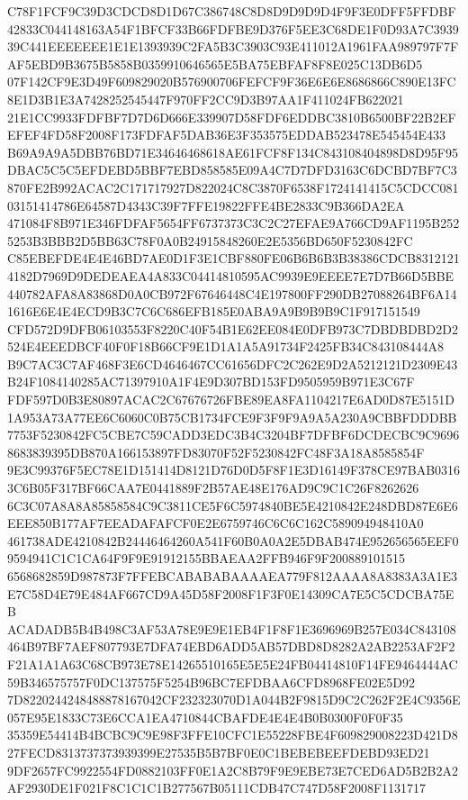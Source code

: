 \documentclass[UTF8,fontset=fandol,zihao=-4,a4paper]{ctexart}
\begin{document}
{{C78F1FCF9C39D3CDCD8D1D67C386748C8D8D9D9D9D4F9F3E0DFF5FFDBF42833C044148163A54F1BFCF33B66FDFBE9D376F5EE3C68DE1F0D93A7C3939
39C441EEEEEEE1E1E1393939C2FA5B3C3903C93E411012A1961FAA989797F7FAF5EBD9B3675B5858B0359910646565E5BA75EBFAF8F8E025C13DB6D5
07F142CF9E3D49F609829020B576900706FEFCF9F36E6E6E8686866C890E13FC8E1D3B1E3A7428252545447F970FF2CC9D3B97AA1F411024FB622021
21E1CC9933FDFBF7D7D6D666E339907D58FDF6EDDBC3810B6500BF22B2EFEFEF4FD58F2008F173FDFAF5DAB36E3F353575EDDAB523478E545454E433
B69A9A9A5DBB76BD71E34646468618AE61FCF8F134C843108404898D8D95F95DBAC5C5C5EFDEBD5BBF7EBD858585E09A4C7D7DFD3163C6DCBD7BF7C3
870FE2B992ACAC2C171717927D822024C8C3870F6538F1724141415C5CDCC08103151414786E64587D4343C39F7FFE19822FFE4BE2833C9B366DA2EA
471084F8B971E346FDFAF5654FF6737373C3C2C27EFAE9A766CD9AF1195B2525253B3BBB2D5BB63C78F0A0B24915848260E2E5356BD650F5230842FC
C85EBEFDE4E4E46BD7AE0D1F3E1CBF880FE06B6B6B3B38386CDCB83121214182D7969D9DEDEAEA4A833C04414810595AC9939E9EEEE7E7D7B66D5BBE
440782AFA8A83868D0A0CB972F67646448C4E197800FF290DB27088264BF6A141616E6E4E4ECD9B3C7C6C686EFB185E0ABA9A9B9B9B9C1F917151549
CFD572D9DFB06103553F8220C40F54B1E62EE084E0DFB973C7DBDBDBD2D2524E4EEEDBCF40F0F18B66CF9E1D1A1A5A91734F2425FB34C843108444A8
B9C7AC3C7AF468F3E6CD4646467CC61656DFC2C262E9D2A5212121D2309E43B24F1084140285AC71397910A1F4E9D307BD153FD9505959B971E3C67F
FDF597D0B3E80897ACAC2C67676726FBE89EA8FA1104217E6AD0D87E5151D1A953A73A77EE6C6060C0B75CB1734FCE9F3F9F9A9A5A230A9CBBFDDDBB
7753F5230842FC5CBE7C59CADD3EDC3B4C3204BF7DFBF6DCDECBC9C96968683839395DB870A166153897FD83070F52F5230842FC48F3A18A8585854F
9E3C99376F5EC78E1D151414D8121D76D0D5F8F1E3D16149F378CE97BAB03163C6B05F317BF66CAA7E0441889F2B57AE48E176AD9C9C1C26F8262626
6C3C07A8A8A85858584C9C3811CE5F6C5974840BE5E4210842E248DBD87E6E6EEE850B177AF7EEADAFAFCF0E2E6759746C6C6C162C589094948410A0
461738ADE4210842B24446464260A541F60B0A0A2E5DBAB474E952656565EEF09594941C1C1CA64F9F9E91912155BBAEAA2FFB946F9F200889101515
6568682859D987873F7FFEBCABABABAAAAEA779F812AAAA8A8383A3A1E3E7C58D4E79E484AF667CD9A45D58F2008F1F3F0E14309CA7E5C5CDCBA75EB
ACADADB5B4B498C3AF53A78E9E9E1EB4F1F8F1E3696969B257E034C843108464B97BF7AEF807793E7DFA74EBD6ADD5AB57DBD8D8282A2AB2253AF2F2
F21A1A1A63C68CB973E78E14265510165E5E5E24FB04414810F14FE9464444AC59B346575757F0DC137575F5254B96BC7EFDBAA6CFD8968FE02E5D92
7D8220244248488878167042CF232323070D1A044B2F9815D9C2C262F2E4C9356E057E95E1833C73E6CCA1EA4710844CBAFDE4E4E4B0B0300F0F0F35
35359E54414B4BCBC9C9E98F3FFE10CFC1E55228FBE4F609829008223D421D827FECD8313737373939399E27535B5B7BF0E0C1BEBEBEEFDEBD93ED21
9DF2657FC9922554FD0882103FF0E1A2C8B79F9E9EBE73E7CED6AD5B2B2A2AF2930DE1F021F8C1C1C1B277567B05111CDB47C747D58F2008F1131717
}}
\end{document}
